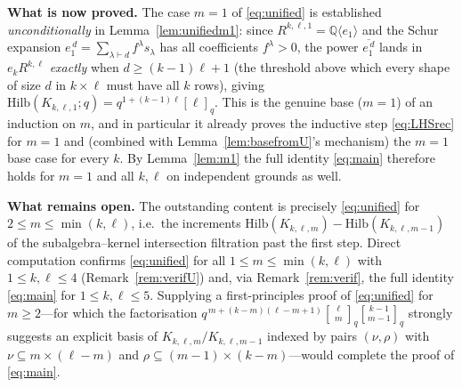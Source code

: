 \documentclass{amsart}
\theoremstyle{definition}
\newcommand{\Hilb}{\mathrm{Hilb}}
\newcommand{\qbin}[2]{\genfrac{[}{]}{0pt}{}{#1}{#2}_q}
\newcommand{\Q}{\mathbb{Q}}
\newcommand{\rkl}{R^{k,\ell}}
\begin{document}
\medskip
\noindent\textbf{What is now proved.}
The case $m=1$ of \eqref{eq:unified} is established \emph{unconditionally} in
Lemma~\ref{lem:unifiedm1}: since $R^{k,\ell,1}=\Q\langle e_1\rangle$ and the Schur
expansion $e_1^{\,d}=\sum_{\lambda\vdash d}f^\lambda s_\lambda$ has all coefficients
$f^\lambda>0$, the power $\overline{e_1^{\,d}}$ lands in $e_k\rkl$ \emph{exactly} when
$d\ge(k-1)\ell+1$ (the threshold above which every shape of size $d$ in $k\times\ell$
must have all $k$ rows), giving $\Hilb(K_{k,\ell,1};q)=q^{1+(k-1)\ell}[\ell]_q$. This
is the genuine base ($m=1$) of an induction on $m$, and in particular it already
proves the inductive step \eqref{eq:LHSrec} for $m=1$ and (combined with
Lemma~\ref{lem:basefromU}'s mechanism) the $m=1$ base case for every $k$. By
Lemma~\ref{lem:m1} the full identity \eqref{eq:main} therefore holds for $m=1$ and all
$k,\ell$ on independent grounds as well.

\medskip
\noindent\textbf{What remains open.}
The outstanding content is precisely \eqref{eq:unified} for $2\le m\le\min(k,\ell)$,
i.e.\ the increments $\Hilb(K_{k,\ell,m})-\Hilb(K_{k,\ell,m-1})$ of the
subalgebra--kernel intersection filtration past the first step. Direct computation
confirms \eqref{eq:unified} for all $1\le m\le\min(k,\ell)$ with $1\le k,\ell\le4$
(Remark~\ref{rem:verifU}) and, via Remark~\ref{rem:verif}, the full identity
\eqref{eq:main} for $1\le k,\ell\le5$. Supplying a first-principles proof of
\eqref{eq:unified} for $m\ge2$---for which the factorisation
$q^{\,m+(k-m)(\ell-m+1)}\qbin{\ell}{m}\qbin{k-1}{m-1}$ strongly suggests an explicit
basis of $K_{k,\ell,m}/K_{k,\ell,m-1}$ indexed by pairs $(\nu,\rho)$ with
$\nu\subseteq m\times(\ell-m)$ and $\rho\subseteq(m-1)\times(k-m)$---would complete the
proof of \eqref{eq:main}.
\end{document}
